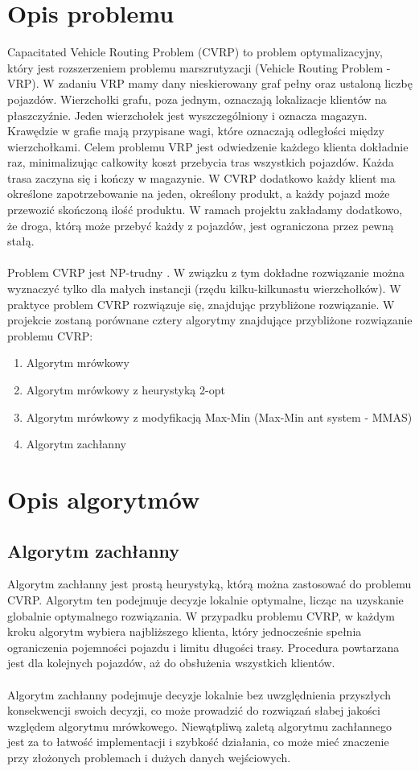 \documentclass{article}
\begin{document}
\section{Opis problemu}

Capacitated Vehicle Routing Problem (CVRP) to problem optymalizacyjny, który jest rozszerzeniem problemu marszrutyzacji (Vehicle Routing Problem - VRP). W zadaniu VRP mamy dany nieskierowany graf pełny oraz ustaloną liczbę pojazdów. Wierzchołki grafu, poza jednym, oznaczają lokalizacje klientów na płaszczyźnie. Jeden wierzchołek jest wyszczególniony i oznacza magazyn. Krawędzie w grafie mają przypisane wagi, które oznaczają odległości między wierzchołkami. Celem problemu VRP jest odwiedzenie każdego klienta dokładnie raz, minimalizując całkowity koszt przebycia tras wszystkich pojazdów. Każda trasa zaczyna się i kończy w magazynie. W CVRP dodatkowo każdy klient ma określone zapotrzebowanie na jeden, określony produkt, a każdy pojazd może przewozić skończoną ilość produktu. W ramach projektu zakładamy dodatkowo, że droga, którą może przebyć każdy z pojazdów, jest ograniczona przez pewną stałą.
\\ \\
Problem CVRP jest NP-trudny \cite{lenstra}. W związku z tym dokładne rozwiązanie można wyznaczyć tylko dla małych instancji (rzędu kilku-kilkunastu wierzchołków). W praktyce problem CVRP rozwiązuje się, znajdując przybliżone rozwiązanie. W projekcie zostaną porównane cztery algorytmy znajdujące przybliżone rozwiązanie problemu CVRP:
\begin{enumerate}
    \item Algorytm mrówkowy
    \item Algorytm mrówkowy z heurystyką 2-opt
    \item Algorytm mrówkowy z modyfikacją Max-Min (Max-Min ant system - MMAS)
    \item Algorytm zachłanny
\end{enumerate}

\section{Opis algorytmów}
\subsection{Algorytm zachłanny}
Algorytm zachłanny jest prostą heurystyką, którą można zastosować do problemu CVRP. Algorytm ten podejmuje decyzje lokalnie optymalne, licząc na uzyskanie globalnie optymalnego rozwiązania. W  przypadku problemu CVRP, w każdym kroku algorytm wybiera najbliższego klienta, który jednocześnie spełnia ograniczenia pojemności pojazdu i limitu długości trasy. Procedura powtarzana jest dla kolejnych pojazdów, aż do obsłużenia wszystkich klientów.
\\ \\
Algorytm zachłanny podejmuje decyzje lokalnie bez uwzględnienia przyszłych konsekwencji swoich decyzji, co może prowadzić do rozwiązań słabej jakości względem algorytmu mrówkowego. Niewątpliwą zaletą algorytmu zachłannego jest za to łatwość implementacji i szybkość działania, co może mieć znaczenie przy złożonych problemach i dużych danych wejściowych.
\end{document}
